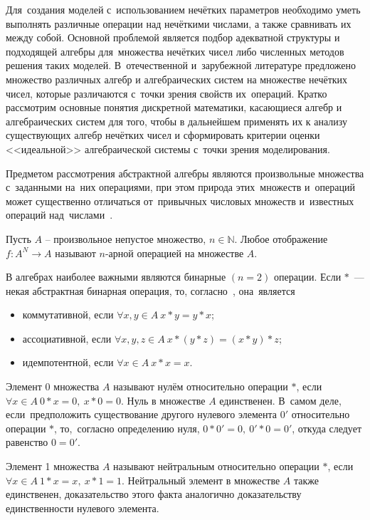 Для~создания моделей с~использованием нечётких параметров необходимо уметь выполнять различные операции над нечёткими числами, а также сравнивать их между собой. Основной проблемой является подбор адекватной структуры и подходящей алгебры для~множества нечётких чисел либо численных методов решения таких моделей. В~отечественной и~зарубежной литературе предложено множество различных алгебр и алгебраических систем на множестве нечётких чисел, которые различаются с~точки зрения свойств их~операций. Кратко рассмотрим основные понятия дискретной математики, касающиеся алгебр и алгебраических систем для того, чтобы в дальнейшем применять их к анализу существующих алгебр нечётких чисел и сформировать критерии оценки <<идеальной>> алгебраической системы с~точки зрения моделирования.

Предметом рассмотрения абстрактной алгебры являются произвольные множества с~заданными на~них операциями, при этом природа этих~множеств и~операций может существенно отличаться от~привычных числовых множеств и~известных операций над~числами~\cite{Bauman_DM}.

\begin{mydef}
Пусть $A$ – произвольное непустое множество, $n\in \mathbb{N}$. Любое отображение $f:A^N \to A$ называют $n$-арной операцией на множестве $A$.
\end{mydef}

В алгебрах наиболее важными являются бинарные $\left( n=2 \right)$ операции. Если $*$~--- некая абстрактная бинарная операция, то, согласно~\cite{Bauman_DM}, она~является
\begin{itemize}
	\item коммутативной, если $\forall x,y\in A\ x*y=y*x$;
	\item ассоциативной, если $\forall x,y,z\in A\ x*\left( y*z \right)=\left( x*y \right)*z$;
	\item идемпотентной, если $\forall x\in A\ x*x=x$.
\end{itemize}

Элемент $0$ множества $A$ называют нулём относительно операции $*$, если $\forall x\in A\ 0*x=0,\ x*0=0$. Нуль в множестве $A$ единственен. В~самом деле, если~предположить существование другого нулевого элемента ${0}'$ относительно операции $*$, то,~согласно определению нуля, $0*{0}'=0,\ {0}'*0={0}'$, откуда следует равенство $0={0}'$.

Элемент 1 множества $A$ называют нейтральным относительно операции $*$, если $\forall x\in A\ 1*x=x,\ x*1=1$.
Нейтральный элемент в множестве $A$ также единственен, доказательство этого факта аналогично доказательству единственности нулевого элемента.

